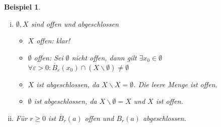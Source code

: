 \documentclass[ngerman,titlepage,twoside, parskip=half*]{scrreprt}
\theoremstyle{break}
\theoremstyle{nonumberbreak}
\newtheorem{beispiel}{Beispiel}
\begin{document}
\begin{beispiel}
  \begin{enumerate}[(i)]
  \item $\emptyset, X$ sind offen und abgeschlossen
    \begin{itemize}
      \item $X$ offen: klar!
      \item $\emptyset$ offen: Sei $\emptyset$ nicht offen, dann gilt
        $\exists x_0\in \emptyset$ \lightning $\forall \varepsilon>0\colon
        \mathring{B_{\varepsilon}}(x_0)\cap (X\backslash
        \emptyset)\neq \emptyset$\lightning 
      \item $X$ ist abgeschlossen, da $X\backslash X=\emptyset$. Die leere Menge ist offen.
      \item $\emptyset$ ist abgeschlossen, da $X\backslash
        \emptyset=X$ und $X$ ist offen.
    \end{itemize}
  \item Für $r\geq 0$ ist $\mathring{B_r}(a)$ offen und $B_r(a)$ abgeschlossen.
\end{enumerate}
\end{beispiel}
\end{document}

